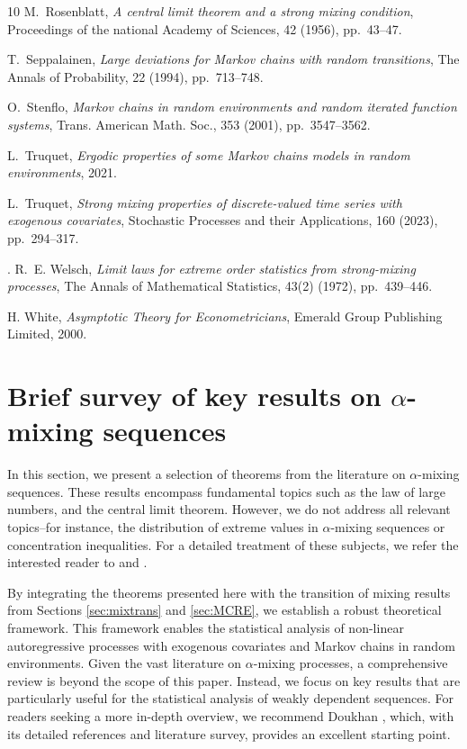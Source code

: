 \documentclass[a4paper,10pt]{article}
\begin{document}
\begin{thebibliography}{10}
	{\sc M.~Rosenblatt}, {\em A central limit theorem and a strong mixing
		condition}, Proceedings of the national Academy of Sciences, 42 (1956),
	pp.~43--47.
	
	{\sc T.~Seppalainen}, {\em Large deviations for Markov chains with random
		transitions}, The Annals of Probability, 22 (1994), pp.~713--748.
	
	{\sc O.~Stenflo}, {\em {M}arkov chains in random environments and random
		iterated function systems}, Trans. American Math. Soc., 353 (2001),
	pp.~3547--3562.
	
	{\sc L.~Truquet}, {\em Ergodic properties of some {M}arkov chains models in
		random environments}, 2021.
	
	{\sc L.~Truquet}, {\em Strong mixing properties of discrete-valued time series
		with exogenous covariates}, Stochastic Processes and their Applications, 160
	(2023), pp.~294--317.
	
	{\sc. R.~E. Welsch}, {\em  Limit laws for extreme order statistics from strong-mixing processes}, The Annals of Mathematical Statistics, 43(2) (1972), pp.~439--446.
	
	{\sc H. White}, {\em Asymptotic Theory for Econometricians}, Emerald Group Publishing Limited, 2000.
	
\end{thebibliography}

\newpage
\appendix
\section{Brief survey of key results on $\alpha$-mixing sequences}\label{sec:mixing_survey}

In this section, we present a selection of theorems from the literature on $\alpha$-mixing sequences. These results encompass fundamental topics such as the law of large numbers, and the central limit theorem. However, we do not address all relevant topics--for instance, the distribution of extreme values in $\alpha$-mixing sequences or concentration inequalities. For a detailed treatment of these subjects, we refer the interested reader to \cite{Welsch1972} and \cite{merlevede2011concentration}.  

By integrating the theorems presented here with the transition of mixing results from Sections \ref{sec:mixtrans} and \ref{sec:MCRE}, we establish a robust theoretical framework. This framework enables the statistical analysis of non-linear autoregressive processes with exogenous covariates and Markov chains in random environments. Given the vast literature on $\alpha$-mixing processes, a comprehensive review is beyond the scope of this paper. Instead, we focus on key results that are particularly useful for the statistical analysis of weakly dependent sequences. For readers seeking a more in-depth overview, we recommend Doukhan \cite{doukhan94}, which, with its detailed references and literature survey, provides an excellent starting point.
\end{document}
